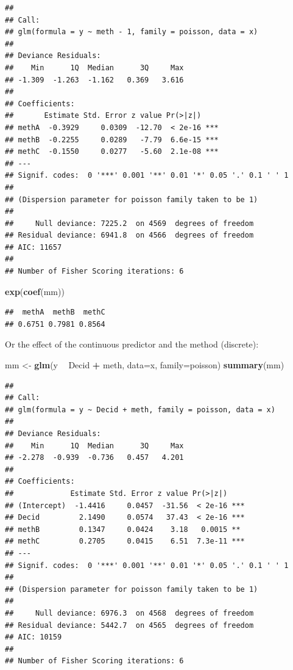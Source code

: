 \documentclass[12pt,]{book}
\newenvironment{Shaded}{\begin{snugshade}}{\end{snugshade}}
\newcommand{\DataTypeTok}[1]{\textcolor[rgb]{0.13,0.29,0.53}{#1}}
\newcommand{\KeywordTok}[1]{\textcolor[rgb]{0.13,0.29,0.53}{\textbf{#1}}}
\newcommand{\NormalTok}[1]{#1}
\newcommand{\OperatorTok}[1]{\textcolor[rgb]{0.81,0.36,0.00}{\textbf{#1}}}
\newcommand{\StringTok}[1]{\textcolor[rgb]{0.31,0.60,0.02}{#1}}
\begin{document}
\begin{verbatim}
## 
## Call:
## glm(formula = y ~ meth - 1, family = poisson, data = x)
## 
## Deviance Residuals: 
##    Min      1Q  Median      3Q     Max  
## -1.309  -1.263  -1.162   0.369   3.616  
## 
## Coefficients:
##       Estimate Std. Error z value Pr(>|z|)    
## methA  -0.3929     0.0309  -12.70  < 2e-16 ***
## methB  -0.2255     0.0289   -7.79  6.6e-15 ***
## methC  -0.1550     0.0277   -5.60  2.1e-08 ***
## ---
## Signif. codes:  0 '***' 0.001 '**' 0.01 '*' 0.05 '.' 0.1 ' ' 1
## 
## (Dispersion parameter for poisson family taken to be 1)
## 
##     Null deviance: 7225.2  on 4569  degrees of freedom
## Residual deviance: 6941.8  on 4566  degrees of freedom
## AIC: 11657
## 
## Number of Fisher Scoring iterations: 6
\end{verbatim}

\begin{Shaded}
\begin{Highlighting}[]
\KeywordTok{exp}\NormalTok{(}\KeywordTok{coef}\NormalTok{(mm))}
\end{Highlighting}
\end{Shaded}

\begin{verbatim}
##  methA  methB  methC 
## 0.6751 0.7981 0.8564
\end{verbatim}

Or the effect of the continuous predictor and the method (discrete):

\begin{Shaded}
\begin{Highlighting}[]
\NormalTok{mm <-}\StringTok{ }\KeywordTok{glm}\NormalTok{(y }\OperatorTok{~}\StringTok{ }\NormalTok{Decid }\OperatorTok{+}\StringTok{ }\NormalTok{meth, }\DataTypeTok{data=}\NormalTok{x, }\DataTypeTok{family=}\NormalTok{poisson)}
\KeywordTok{summary}\NormalTok{(mm)}
\end{Highlighting}
\end{Shaded}

\begin{verbatim}
## 
## Call:
## glm(formula = y ~ Decid + meth, family = poisson, data = x)
## 
## Deviance Residuals: 
##    Min      1Q  Median      3Q     Max  
## -2.278  -0.939  -0.736   0.457   4.201  
## 
## Coefficients:
##             Estimate Std. Error z value Pr(>|z|)    
## (Intercept)  -1.4416     0.0457  -31.56  < 2e-16 ***
## Decid         2.1490     0.0574   37.43  < 2e-16 ***
## methB         0.1347     0.0424    3.18   0.0015 ** 
## methC         0.2705     0.0415    6.51  7.3e-11 ***
## ---
## Signif. codes:  0 '***' 0.001 '**' 0.01 '*' 0.05 '.' 0.1 ' ' 1
## 
## (Dispersion parameter for poisson family taken to be 1)
## 
##     Null deviance: 6976.3  on 4568  degrees of freedom
## Residual deviance: 5442.7  on 4565  degrees of freedom
## AIC: 10159
## 
## Number of Fisher Scoring iterations: 6
\end{verbatim}
\end{document}
